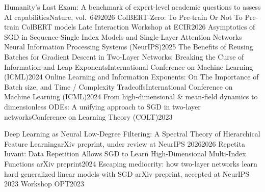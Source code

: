 \begin{cvcompact}
\end{cvcompact}

\begin{cvpublist}
  {Humanity's Last Exam: A benchmark of expert-level academic questions to assess AI
   capabilities}{Nature, vol.~649}{2026}
  {ColBERT-Zero: To Pre-train Or Not To Pre-train ColBERT models}
  {Late Interaction Workshop at ECIR}{2026}
  {Asymptotics of SGD in Sequence-Single Index Models and Single-Layer Attention Networks}
  {Neural Information Processing Systems (NeurIPS)}{2025}
  {The Benefits of Reusing Batches for Gradient Descent in Two-Layer Networks: Breaking the
   Curse of Information and Leap Exponents}{International Conference on Machine Learning (ICML)}{2024}
  {Online Learning and Information Exponents: On The Importance of Batch size, and
   Time / Complexity Tradeoffs}{International Conference on Machine Learning (ICML)}{2024}
  {From high-dimensional \& mean-field dynamics to dimensionless ODEs: A unifying approach to
   SGD in two-layer networks}{Conference on Learning Theory (COLT)}{2023}
\end{cvpublist}

\begin{cvpublist}
  {Deep Learning as Neural Low-Degree Filtering: A Spectral Theory of Hierarchical Feature
   Learning}{arXiv preprint, under review at NeurIPS 2026}{2026}
  {Repetita Iuvant: Data Repetition Allows SGD to Learn High-Dimensional Multi-Index Functions}
  {arXiv preprint}{2024}
  {Escaping mediocrity: how two-layer networks learn hard generalized linear models with SGD}
  {arXiv preprint, accepted at NeurIPS 2023 Workshop OPT}{2023}
\end{cvpublist}
